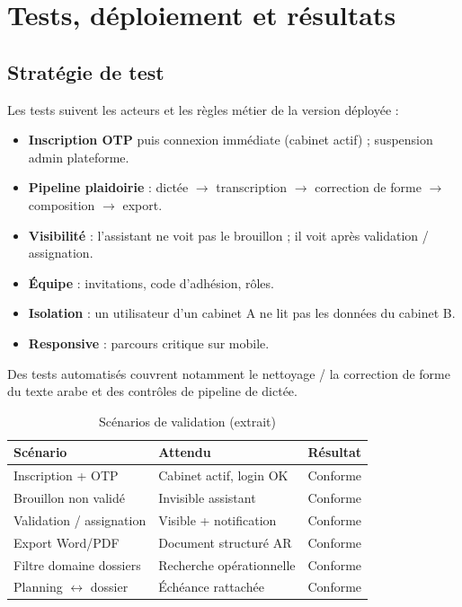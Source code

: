 \chapter{Tests, déploiement et résultats}
\label{ch:tests}

\section{Stratégie de test}

Les tests suivent les acteurs et les règles métier de la version déployée :

\begin{itemize}[leftmargin=1.4em]
  \item \textbf{Inscription OTP} puis connexion immédiate (cabinet actif) ; suspension admin plateforme.
  \item \textbf{Pipeline plaidoirie} : dictée $\rightarrow$ transcription $\rightarrow$ correction de forme $\rightarrow$ composition $\rightarrow$ export.
  \item \textbf{Visibilité} : l'assistant ne voit pas le brouillon ; il voit après validation / assignation.
  \item \textbf{Équipe} : invitations, code d'adhésion, rôles.
  \item \textbf{Isolation} : un utilisateur d'un cabinet A ne lit pas les données du cabinet B.
  \item \textbf{Responsive} : parcours critique sur mobile.
\end{itemize}

Des tests automatisés couvrent notamment le nettoyage / la correction de forme du texte arabe et des contrôles de pipeline de dictée.

\begin{table}[H]
\centering
\caption{Scénarios de validation (extrait)}
\label{tab:scenarios}
\small
\renewcommand{\arraystretch}{1.2}
\begin{tabular}{@{}p{3.2cm}p{5.0cm}p{4.4cm}@{}}
\toprule
\textbf{Scénario} & \textbf{Attendu} & \textbf{Résultat} \\
\midrule
Inscription + OTP & Cabinet actif, login OK & Conforme \\
Brouillon non validé & Invisible assistant & Conforme \\
Validation / assignation & Visible + notification & Conforme \\
Export Word/PDF & Document structuré AR & Conforme \\
Filtre domaine dossiers & Recherche opérationnelle & Conforme \\
Planning $\leftrightarrow$ dossier & Échéance rattachée & Conforme \\
\bottomrule
\end{tabular}
\end{table}

